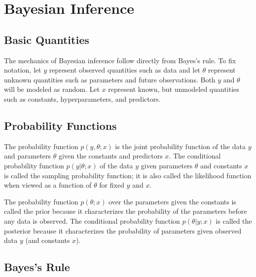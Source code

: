 \section{Bayesian Inference}

\subsection{Basic Quantities}

The mechanics of Bayesian inference follow directly from Bayes's rule.
To fix notation, let $y$ represent observed quantities such as data
and let $\theta$ represent unknown quantities such as parameters and
future observations.  Both $y$ and $\theta$ will be modeled as random.
Let $x$ represent known, but unmodeled quantities such as constants,
hyperparameters, and predictors.

\subsection{Probability Functions}

The probability function $p(y,\theta;x)$ is the joint probability
function of the data $y$ and parameters $\theta$ given the constants
and predictors $x$.  The conditional probability function
$p(y|\theta;x)$ of the data $y$ given parameters $\theta$ and
constants $x$ is called the sampling probability function;  it is also
called the likelihood function when viewed as a function of $\theta$
for fixed $y$ and $x$.  

The probability function $p(\theta;x)$ over the parameters given the
constants is called the prior because it characterizes the probability
of the parameters before any data is observed.  The conditional
probability function $p(\theta|y;x)$ is called the posterior because
it characterizes the probability of parameters given observed data $y$
(and constants $x$).  

\subsection{Bayes's Rule}

